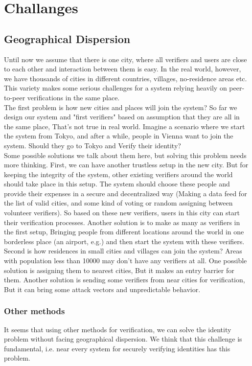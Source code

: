 \documentclass[conference]{IEEEtran}
\begin{document}
\section{Challanges }


\subsection{Geographical Dispersion}
Until now we assume that there is one city, where all verifiers and users are close to each other and interaction between them is easy. In the real world, however, we have thousands of cities in different countries, villages, no-residence areas etc. This variety makes some serious challenges for a system relying heavily on peer-to-peer verifications in the same place.
\\
The first problem is how new cities and places will join the system? So far we design our system and "first verifiers" based on assumption that they are all in the same place, That's not true in real world. Imagine a scenario where we start the system from Tokyo, and after a while, people in Vienna want to join the system. Should they go to Tokyo and Verify their identity?
\\
Some possible solutions we talk about them here, but solving this problem needs more thinking. First, we can have another trustless setup in the new city. But for keeping the integrity of the system, other existing verifiers around the world should take place in this setup. The system should choose these people and provide their expenses in a secure and decentralized way (Making a data feed for the list of valid cities, and some kind of voting or random assigning between volunteer verifiers). So based on these new verifiers, users in this city can start their verification processes. Another solution is to make as many as verifiers in the first setup, Bringing people from different locations around the world in one borderless place (an airport, e.g.) and then start the system with these verifiers. 
\\

Second is how residences in small cities and villages can join the system? Areas with population less than 10000  may don't have any verifiers at all. One possible solution is assigning them to nearest cities, But it makes an entry barrier for them. Another solution is sending some verifiers from near cities for verification, But it can bring some attack vectors and unpredictable behavior. 

\subsubsection*{Other methods}
It seems that using other methods for verification, we can solve the identity problem without facing geographical dispersion. We think that this challenge is fundamental, i.e. near every system for securely verifying identities has this problem.
\\
\end{document}
